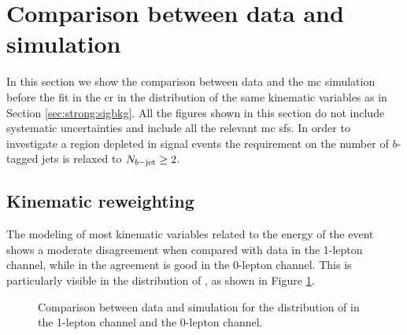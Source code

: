%
\section{Comparison between data and simulation}
\label{sec:strong:dataMC}
In this section we show the comparison between data and the \gls{mc} simulation before the fit in the \gls{cr}
in the distribution of the same kinematic variables as in Section \ref{sec:strong:sigbkg}. 
All the figures shown in this section do not include systematic uncertainties and include all the relevant \gls{mc} \glspl{sf}. 
In order to investigate a region depleted in signal events the requirement on the number
of $b$-tagged jets is relaxed to $N_{b\mathrm{-jet}} \geq 2$. 

\subsection{Kinematic reweighting}
\label{sec:strong:kinrw}

The modeling of most kinematic variables related to the energy of the event shows a moderate disagreement 
when compared with data in the 1-lepton channel, while in the agreement is good in the 0-lepton channel. 
This is particularly visible in the distribution of \meff, as shown in Figure \ref{fig:strong:datamc:meff_prerw}.

\begin{figure}[h]
\centering 
{}
\caption{Comparison between data and simulation for the distribution of \meff in  the 1-lepton channel and 
the 0-lepton channel.
}
\label{fig:strong:datamc:meff_prerw}
\end{figure}

